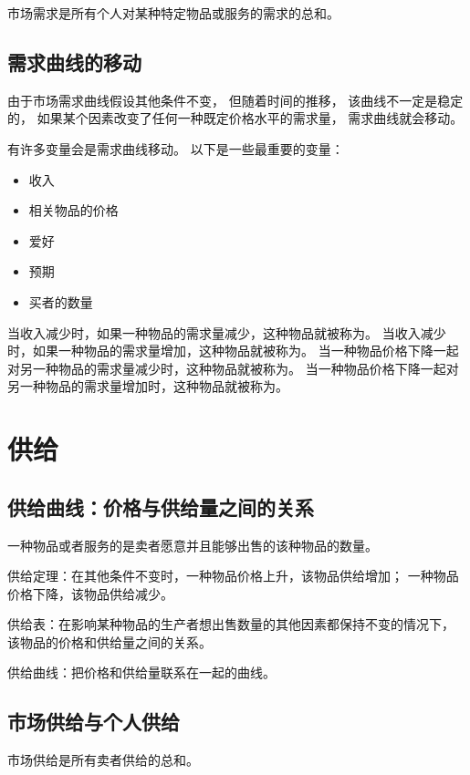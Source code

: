 市场需求是所有个人对某种特定物品或服务的需求的总和。


\subsection{需求曲线的移动}

由于市场需求曲线假设其他条件不变，
但随着时间的推移，
该曲线不一定是稳定的，
如果某个因素改变了任何一种既定价格水平的需求量，
需求曲线就会移动。


有许多变量会是需求曲线移动。
以下是一些最重要的变量：
\begin{itemize}
\item 收入
\item 相关物品的价格
\item 爱好
\item 预期
\item 买者的数量
\end{itemize}

当收入减少时，如果一种物品的需求量减少，这种物品就被称为。
当收入减少时，如果一种物品的需求量增加，这种物品就被称为。
当一种物品价格下降一起对另一种物品的需求量减少时，这种物品就被称为。
当一种物品价格下降一起对另一种物品的需求量增加时，这种物品就被称为。


\section{供给}

\subsection{供给曲线：价格与供给量之间的关系}

一种物品或者服务的是卖者愿意并且能够出售的该种物品的数量。

供给定理：在其他条件不变时，一种物品价格上升，该物品供给增加；
一种物品价格下降，该物品供给减少。

供给表：在影响某种物品的生产者想出售数量的其他因素都保持不变的情况下，
该物品的价格和供给量之间的关系。

供给曲线：把价格和供给量联系在一起的曲线。



\subsection{市场供给与个人供给}

市场供给是所有卖者供给的总和。


